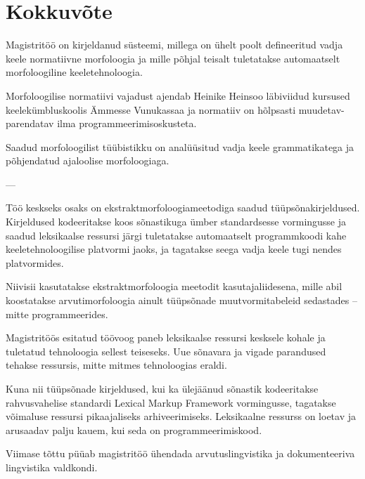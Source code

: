 \documentclass[12pt,a4paper]{article}
\begin{document}
\newpage
\section{Kokkuvõte}

Magistritöö on kirjeldanud süsteemi, millega on ühelt poolt defineeritud vadja keele normatiivne morfoloogia ja mille põhjal teisalt tuletatakse automaatselt morfoloogiline keeletehnoloogia.

Morfoloogilise normatiivi vajadust ajendab Heinike Heinsoo läbiviidud kursused keelekümbluskoolis Ämmesse Vunukassaa ja normatiiv on hõlpsasti muudetav-parendatav ilma programmeerimisoskusteta.

Saadud morfoloogilist tüübistikku on analüüsitud vadja keele grammatikatega ja põhjendatud ajaloolise morfoloogiaga.

---

Töö keskseks osaks on ekstraktmorfoloogiameetodiga saadud tüüpsõnakirjeldused.
Kirjeldused kodeeritakse koos sõnastikuga ümber standardsesse vormingusse ja saadud leksikaalse ressursi järgi tuletatakse automaatselt programmkoodi kahe keeletehnoloogilise platvormi jaoks, ja tagatakse seega vadja keele tugi nendes platvormides.

Niivisii kasutatakse ekstraktmorfoloogia meetodit kasutaja\-liidesena, mille abil koostatakse arvutimorfoloogia ainult tüüpsõnade muutvormitabeleid sedastades -- mitte programmeerides.

Magistritöös esitatud töövoog paneb leksikaalse ressursi kesksele kohale ja tuletatud tehnoloogia sellest teiseseks. Uue sõnavara ja vigade parandused tehakse ressursis, mitte mitmes tehnoloogias eraldi.

Kuna nii tüüpsõnade kirjeldused, kui ka ülejäänud sõnastik kodeeritakse rahvusvahelise standardi Lexical Markup Framework vormingusse, tagatakse võimaluse ressursi pikaajaliseks arhiveerimiseks. Leksikaalne ressurss on loetav ja arusaadav palju kauem, kui seda on programmeerimiskood.

Viimase tõttu püüab magistritöö ühendada arvutuslingvistika ja dokumenteeriva lingvistika valdkondi.
\end{document}

